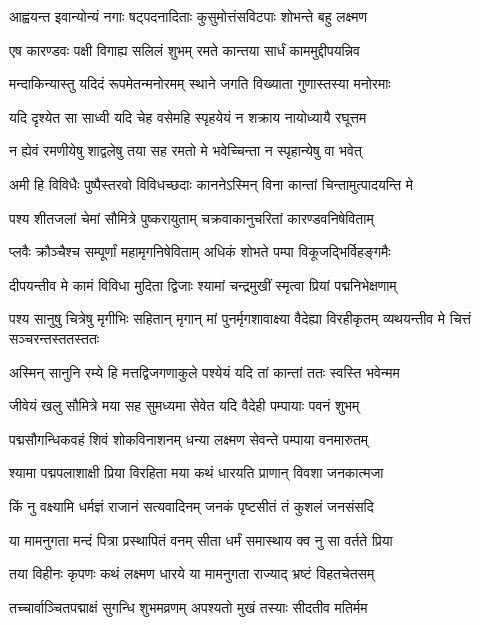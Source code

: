 \twolineshloka
{आह्वयन्त इवान्योन्यं नगाः षट्पदनादिताः}
{कुसुमोत्तंसविटपाः शोभन्ते बहु लक्ष्मण} %

\twolineshloka
{एष कारण्डवः पक्षी विगाह्य सलिलं शुभम्}
{रमते कान्तया सार्धं काममुद्दीपयन्निव} %

\twolineshloka
{मन्दाकिन्यास्तु यदिदं रूपमेतन्मनोरमम्}
{स्थाने जगति विख्याता गुणास्तस्या मनोरमाः} %

\twolineshloka
{यदि दृश्येत सा साध्वी यदि चेह वसेमहि}
{स्पृहयेयं न शक्राय नायोध्यायै रघूत्तम} %

\twolineshloka
{न ह्येवं रमणीयेषु शाद्वलेषु तया सह}
{रमतो मे भवेच्चिन्ता न स्पृहान्येषु वा भवेत्} %

\twolineshloka
{अमी हि विविधैः पुष्पैस्तरवो विविधच्छदाः}
{काननेऽस्मिन् विना कान्तां चिन्तामुत्पादयन्ति मे} %

\twolineshloka
{पश्य शीतजलां चेमां सौमित्रे पुष्करायुताम्}
{चक्रवाकानुचरितां कारण्डवनिषेविताम्} %

\twolineshloka
{प्लवैः क्रौञ्चैश्च सम्पूर्णां महामृगनिषेविताम्}
{अधिकं शोभते पम्पा विकूजद्भिर्विहङ्गमैः} %

\twolineshloka
{दीपयन्तीव मे कामं विविधा मुदिता द्विजाः}
{श्यामां चन्द्रमुखीं स्मृत्वा प्रियां पद्मनिभेक्षणाम्} %

\threelineshloka
{पश्य सानुषु चित्रेषु मृगीभिः सहितान् मृगान्}
{मां पुनर्मृगशावाक्ष्या वैदेह्या विरहीकृतम्}
{व्यथयन्तीव मे चित्तं सञ्चरन्तस्ततस्ततः} %

\twolineshloka
{अस्मिन् सानुनि रम्ये हि मत्तद्विजगणाकुले}
{पश्येयं यदि तां कान्तां ततः स्वस्ति भवेन्मम} %

\twolineshloka
{जीवेयं खलु सौमित्रे मया सह सुमध्यमा}
{सेवेत यदि वैदेही पम्पायाः पवनं शुभम्} %

\twolineshloka
{पद्मसौगन्धिकवहं शिवं शोकविनाशनम्}
{धन्या लक्ष्मण सेवन्ते पम्पाया वनमारुतम्} %

\twolineshloka
{श्यामा पद्मपलाशाक्षी प्रिया विरहिता मया}
{कथं धारयति प्राणान् विवशा जनकात्मजा} %

\twolineshloka
{किं नु वक्ष्यामि धर्मज्ञं राजानं सत्यवादिनम्}
{जनकं पृष्टसीतं तं कुशलं जनसंसदि} %

\twolineshloka
{या मामनुगता मन्दं पित्रा प्रस्थापितं वनम्}
{सीता धर्मं समास्थाय क्व नु सा वर्तते प्रिया} %

\twolineshloka
{तया विहीनः कृपणः कथं लक्ष्मण धारये}
{या मामनुगता राज्याद् भ्रष्टं विहतचेतसम्} %

\twolineshloka
{तच्चार्वाञ्चितपद्माक्षं सुगन्धि शुभमव्रणम्}
{अपश्यतो मुखं तस्याः सीदतीव मतिर्मम} %

